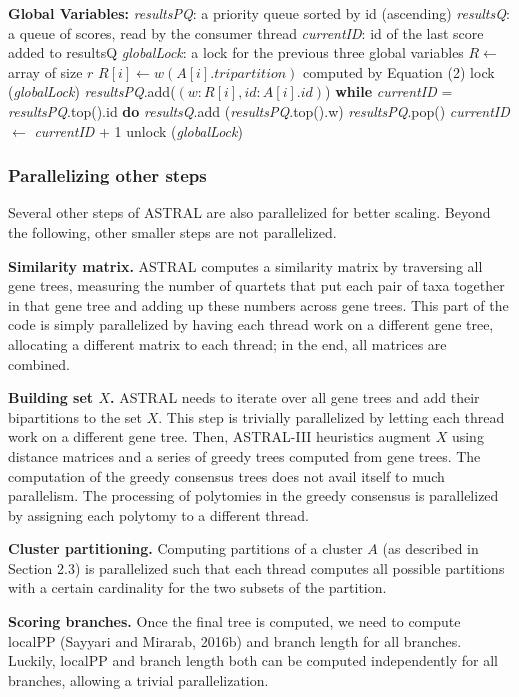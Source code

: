 \documentclass[12pt]{article}
\begin{document}
\begin{algorithm}
\caption{The procedure run by each short-lived thread to calculate weights and to propagate results first to the priority queue and then to the final queue. $A$ is a list that contains $r$ tripartitions, id pairs.}
\begin{algorithmic}[1]
\State \textbf{Global Variables:}
\State \textit{resultsPQ}: a priority queue sorted by id (ascending)
\State \textit{resultsQ}: a queue of scores, read by the consumer thread
\State \textit{currentID}: id of the last score added to resultsQ
\State \textit{globalLock}: a lock for the previous three global variables
\State $R \leftarrow$ array of size $r$
\State $R[i] \leftarrow w(A[i].tripartition)$ computed by Equation (2)
\EndFor
\State lock (\textit{globalLock})
\State \textit{resultsPQ}.add($(w: R[i], id: A[i].id)$)
\State \textbf{while} \textit{currentID} = \textit{resultsPQ}.top().id \textbf{do}
\State \textit{resultsQ}.add (\textit{resultsPQ}.top().w)
\State \textit{resultsPQ}.pop()
\State \textit{currentID} $\leftarrow$ \textit{currentID} + 1
\EndFor
\State unlock (\textit{globalLock})
\EndProcedure
\end{algorithmic}
\end{algorithm}

\subsubsection{Parallelizing other steps}
Several other steps of ASTRAL are also parallelized for better scaling. Beyond the following, other smaller steps are not parallelized.

\textbf{Similarity matrix.} ASTRAL computes a similarity matrix by traversing all gene trees, measuring the number of quartets that put each pair of taxa together in that gene tree and adding up these numbers across gene trees. This part of the code is simply parallelized by having each thread work on a different gene tree, allocating a different matrix to each thread; in the end, all matrices are combined.

\textbf{Building set $X$.} ASTRAL needs to iterate over all gene trees and add their bipartitions to the set $X$. This step is trivially parallelized by letting each thread work on a different gene tree. Then, ASTRAL-III heuristics augment $X$ using distance matrices and a series of greedy trees computed from gene trees. The computation of the greedy consensus trees does not avail itself to much parallelism. The processing of polytomies in the greedy consensus is parallelized by assigning each polytomy to a different thread.

\textbf{Cluster partitioning.} Computing partitions of a cluster $A$ (as described in Section 2.3) is parallelized such that each thread computes all possible partitions with a certain cardinality for the two subsets of the partition.

\textbf{Scoring branches.} Once the final tree is computed, we need to compute localPP (Sayyari and Mirarab, 2016b) and branch length for all branches. Luckily, localPP and branch length both can be computed independently for all branches, allowing a trivial parallelization.
\end{document}
